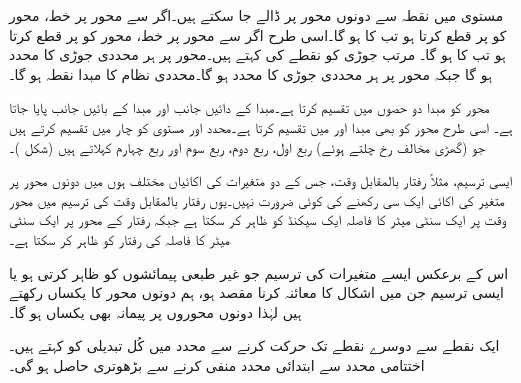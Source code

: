 مستوی میں نقطہ  سے دونوں محور پر  ڈالے  جا سکتے ہیں۔اگر  سے محور  پر  خط، محور  کو  پر قطع کرتا ہو تب  کا   ہو گا۔اسی طرح اگر  سے محور  پر  خط،  محور  کو  پر قطع کرتا ہو تب  کا   ہو گا۔  مرتب جوڑی  کو نقطے کی  کہتے ہیں۔محور  پر ہر محددی جوڑی کا  محدد  ہو گا جبکہ محور  پر ہر محددی جوڑی کا  محدد  ہو گا۔محددی نظام کا مبدا نقطہ  ہو گا۔ 

محور   کو مبدا دو حصوں میں تقسیم کرتا ہے۔مبدا کے دائیں جانب  اور مبدا کے بائیں جانب  پایا جاتا ہے۔ اسی طرح محور  کو   بھی  مبدا  اور  میں تقسیم کرتا ہے۔محدد   اور  مستوی کو چار  میں تقسیم کرتے ہیں جو (گھڑی مخالف رخ چلتے ہوئے) ربع اول، ربع دوم، ربع سوم اور ربع چہارم کہلاتے ہیں (شکل )۔

ایسی  ترسیم، مثلاً رفتار بالمقابل وقت، جس کے دو متغیرات کی اکائیاں مختلف ہوں میں دونوں محور پر متغیر کی  اکائی   ایک  سی رکھنے کی کوئی ضرورت نہیں۔یوں رفتار بالمقابل وقت کی ترسیم میں محور وقت پر ایک سنٹی میٹر کا فاصلہ ایک سیکنڈ کو ظاہر کر سکتا ہے جبکہ رفتار کے محور پر ایک سنٹی میٹر کا فاصلہ  کی رفتار کو ظاہر کر سکتا ہے۔

اس کے برعکس ایسے متغیرات کی ترسیم جو غیر طبعی پیمائشوں کو ظاہر کرتی ہو یا ایسی ترسیم جن میں اشکال کا معائنہ کرنا مقصد ہو، ہم دونوں محور کا     یکساں رکھتے ہیں لہٰذا دونوں محوروں پر پیمانہ بھی  یکساں ہو گا۔

ایک نقطے  سے دوسرے نقطے تک حرکت کرنے سے محدد میں کُل تبدیلی کو  کہتے ہیں۔ اختتامی محدد سے ابتدائی محدد منفی کرنے سے بڑھوتری حاصل ہو گی۔

